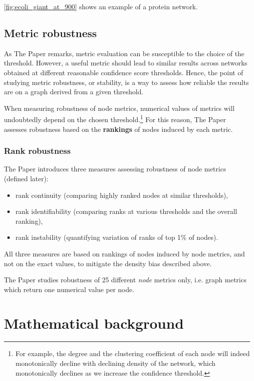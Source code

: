 \autoref{fig:ecoli_giant_at_900} shows an example of a protein network.

\subsection{Metric robustness}

As The Paper remarks, metric evaluation can be susceptible to the choice of the threshold.
However, a useful metric should lead to similar results across networks obtained at different reasonable confidence score thresholds.
Hence, the point of studying metric robustness, or stability, is a way to assess how reliable the results are on a graph derived from a given threshold.

When measuring robustness of node metrics, numerical values of metrics will undoubtedly depend on the chosen threshold.\footnote{For example, the degree and the clustering coefficient of each node will indeed monotonically decline with declining density of the network, which monotonically declines as we increase the confidence threshold.}
For this reason, The Paper assesses robustness based on the \textbf{rankings} of nodes induced by each metric.

\subsubsection*{Rank robustness}

The Paper introduces three measures assessing robustness of node metrics (defined later):
\begin{itemize}[topsep=5pt]
    \item rank continuity (comparing highly ranked nodes at similar thresholds),
    \item rank identifiability (comparing ranks at various thresholds and the overall ranking),
    \item rank instability (quantifying variation of ranks of top 1\% of nodes).
\end{itemize}
All three measures are based on rankings of nodes induced by node metrics, and not on the exact values, to mitigate the density bias described above.

The Paper studies robustness of 25 different \textsl{node} metrics only, i.e. graph metrics which return one numerical value per node.


\section{Mathematical background}\label{sec:math_background}

